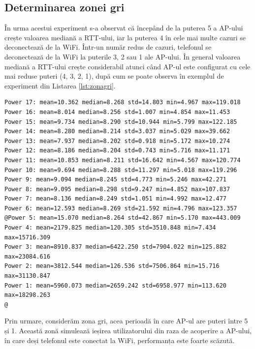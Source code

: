 \subsection{Determinarea zonei gri}

În urma acestui experiment s-a observat că începând de la puterea 5 a AP-ului crește valoarea mediană a RTT-ului, iar la puterea 4 în cele mai multe cazuri se deconectează de la WiFi. Într-un număr redus de cazuri, telefonul se deconectează de la WiFi la puterile 3, 2 sau 1 ale AP-ului. În general valoarea mediană a RTT-ului crește considerabil atunci când AP-ul este configurat cu cele mai reduse puteri (4, 3, 2, 1), după cum se poate observa în exemplul de experiment din Listarea \ref{lst:zonagri}.


\begin{lstlisting}[label={lst:zonagri}, caption=Exemplu de zona gri, frame=single, style=base]
Power 17: mean=10.362 median=8.268 std=14.803 min=4.967 max=119.018
Power 16: mean=8.014 median=8.256 std=1.007 min=4.854 max=11.453
Power 15: mean=9.734 median=8.290 std=10.944 min=5.799 max=122.185
Power 14: mean=8.280 median=8.214 std=3.037 min=5.029 max=39.662
Power 13: mean=7.937 median=8.202 std=0.918 min=5.172 max=10.274
Power 12: mean=8.186 median=8.204 std=0.743 min=5.716 max=11.171
Power 11: mean=10.853 median=8.211 std=16.642 min=4.567 max=120.774
Power 10: mean=9.694 median=8.288 std=11.297 min=5.018 max=119.296
Power 9: mean=9.094 median=8.245 std=4.773 min=5.246 max=42.271
Power 8: mean=9.095 median=8.298 std=9.247 min=4.852 max=107.837
Power 7: mean=8.136 median=8.249 std=1.051 min=4.992 max=12.477
Power 6: mean=12.593 median=8.269 std=21.592 min=4.796 max=123.357
@Power 5: mean=15.070 median=8.264 std=42.867 min=5.170 max=443.009
Power 4: mean=2179.825 median=120.305 std=3510.848 min=7.434 max=15716.309
Power 3: mean=8910.837 median=6422.250 std=7904.022 min=125.882 max=23084.616
Power 2: mean=3812.544 median=126.536 std=7506.864 min=15.716 max=31130.847
Power 1: mean=5960.073 median=2659.242 std=6958.977 min=113.620 max=18298.263
@
\end{lstlisting}

Prin urmare, considerăm zona gri, acea perioadă în care AP-ul are puteri între 5 și 1. Această zonă simulează ieșirea utilizatorului din raza de acoperire a AP-ului, în care deși telefonul este conectat la WiFi, performanța este foarte scăzută. 

